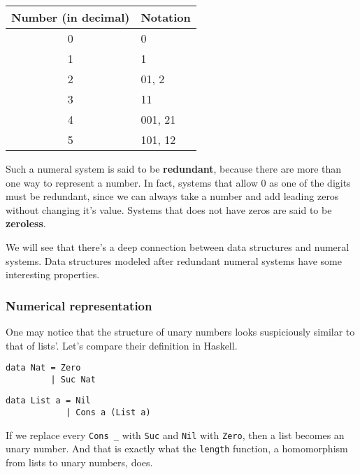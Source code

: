 \documentclass[../thesis.tex]{subfiles}
\begin{document}
\begin{center}
    \begin{tabular}{c*{1}{l}}
    Number (in decimal)  & Notation \\
    \hline
    0       & 0 \\
    1       & 1 \\
    2       & 01, 2 \\
    3       & 11 \\
    4       & 001, 21 \\
    5       & 101, 12 \\
    \end{tabular}
\end{center}

Such a numeral system is said to be \textbf{redundant}, because there are more than one
way to represent a number. In fact, systems that allow $ 0 $ as one of the digits
must be redundant, since we can always take a number and add leading zeros without
changing it's value. Systems that does not have zeros are said to be \textbf{zeroless}.

We will see that there's a deep connection between data
structures and  numeral systems. Data structures modeled after redundant numeral
systems have some interesting properties.

\subsubsection{Numerical representation}

One may notice that the structure of unary numbers looks suspiciously similar
to that of lists'. Let's compare their definition in Haskell.

\noindent\begin{minipage}{.45\textwidth}
\begin{lstlisting}
data Nat = Zero
         | Suc Nat
\end{lstlisting}
\end{minipage}\hfill
\begin{minipage}{.48\textwidth}
\begin{lstlisting}
data List a = Nil
            | Cons a (List a)
\end{lstlisting}
\end{minipage}

If we replace every {\lstinline|Cons _|} with {\lstinline|Suc|} and {\lstinline|Nil|}
with {\lstinline|Zero|}, then a list becomes an unary number.
And that is exactly what the {\lstinline|length|} function,
a homomorphism from lists to unary numbers, does.
\end{document}
